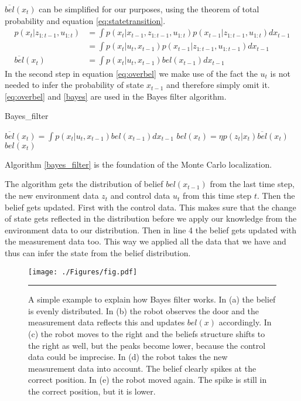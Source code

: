 $\overline{bel}(x_t)$ can be simplified for our purposes, using the theorem of total probability and equation \ref{eq:statetransition}. \\\cite[p. 31-33]{Thrun:2005:PR:1121596}
\begin{equation} \label{eq:overbel}
\begin{aligned}
p(x_t|z_{1:t-1},u_{1:t}) &= \int p(x_t|x_{t-1},z_{1:t-1},u_{1:t})p(x_{t-1}|z_{1:t-1},u_{1:t})dx_{t-1}\\
&= \int p(x_t|u_t,x_{t-1})p(x_{t-1}|z_{1:t-1},u_{1:t-1})dx_{t-1}\\
\overline{bel}(x_t) &= \int p(x_t|u_t,x_{t-1})bel(x_{t-1})dx_{t-1}
\end{aligned}
\end{equation}
In the second step in equation \ref{eq:overbel} we make use of the fact the $u_t$ is not needed to infer the probability of state $x_{t-1}$ and therefore simply omit it. 
\ref{eq:overbel} and \ref{bayes} are used in the Bayes filter algorithm.
\begin{algorithm}
\caption{Bayes\_filter \cite[p. 27]{Thrun:2005:PR:1121596}}
\label{bayes_filter}
\begin{algorithmic}[1]
\State $\overline{bel}(x_t) = \int p(x_t|u_t,x_{t-1})bel(x_{t-1})dx_{t-1}$
\State $bel(x_t) = \eta p(z_t|x_t)\overline{bel}(x_t)$
\EndFor
\State \Return $bel(x_t)$
\EndProcedure
\end{algorithmic}
\end{algorithm}

Algorithm \ref{bayes_filter} is the foundation of the Monte Carlo localization. 

The algorithm gets the distribution of belief $bel(x_{t-1})$ from the last time step, the new environment data $z_t$ and control data $u_t$ from this time step $t$. Then the belief gets updated. First with the control data. This makes sure that the change of state gets reflected in the distribution before we apply our knowledge from the environment data to our distribution. Then in line 4 the belief gets updated with the measurement data too. This way we applied all the data that we have and thus can infer the state from the belief distribution.

\begin{figure}[htbp]
	\centering
		\texttt{[image: ./Figures/fig.pdf]}
		\rule{35em}{0.5pt}
	\caption[Localization Example]{A simple example to explain how Bayes filter works. In (a) the belief is evenly distributed. In (b) the robot observes the door and the measurement data reflects this and updates $bel(x)$ accordingly. In (c) the robot moves to the right and the beliefs structure shifts to the right as well, but the peaks become lower, because the control data could be imprecise. In (d) the robot takes the new measurement data into account. The belief clearly spikes at the correct position. In (e) the robot moved again. The spike is still in the correct position, but it is lower. \cite[p. 6]{Thrun:2005:PR:1121596}}
	\label{fig:loc_example}
\end{figure}

